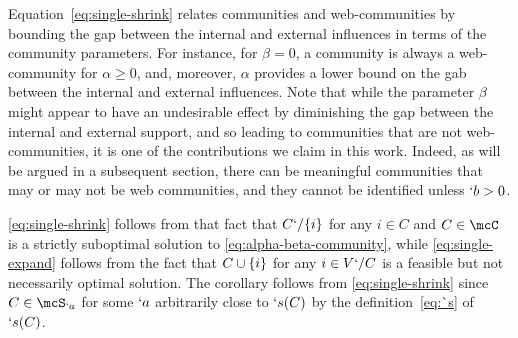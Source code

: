 Equation~\eqref{eq:single-shrink} relates communities and web-communities by 
bounding the gap between the internal and external influences in terms of the community
parameters. For instance, for
$\beta = 0$, a community is always a web-community for $\alpha\geq 0$, and, moreover, $\alpha$ 
provides a lower bound on the gab between the internal and external influences.
Note that while the parameter $\beta$ might appear to have an undesirable effect by diminishing the gap between the
internal and external support, and so leading to communities that are not web-communities,
it is one of the contributions we claim in this work.
Indeed, as will be argued in a subsequent section, there can be meaningful communities that may or
may not be web communities, and they cannot be identified unless $`b>0$.



\begin{Proof}[Sketch]
  \eqref{eq:single-shrink} follows from that fact that $C`/\{i\}$ for any $i\in C$ and $C\in \mcC$ is a strictly
  suboptimal solution to \eqref{eq:alpha-beta-community}, while \eqref{eq:single-expand} follows
  from the fact that $C\cup \{i\}$ for any $i\in V`/C$ is a feasible but not necessarily optimal
  solution. The corollary follows from \eqref{eq:single-shrink} since $C\in \mcS_{`a}$ for some $`a$
  arbitrarily close to $`s(C)$ by the definition~\eqref{eq:`s} of $`s(C)$.
\end{Proof}

